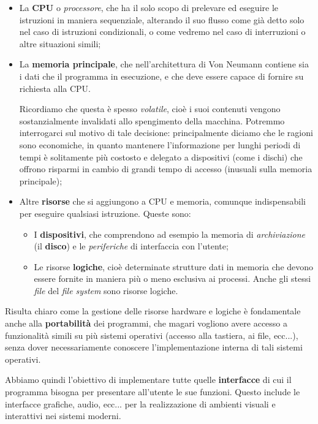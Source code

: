 \documentclass[a4paper,11pt]{article}
\begin{document}
\begin{itemize}
	\item La \textbf{CPU} o \textit{processore}, che ha il solo scopo di prelevare ed eseguire le istruzioni in maniera sequenziale, alterando il suo flusso come già detto solo nel caso di istruzioni condizionali, o come vedremo nel caso di interruzioni o altre situazioni simili;
	\item La \textbf{memoria principale}, che nell'architettura di Von Neumann contiene sia i dati che il programma in esecuzione, e che deve essere capace di fornire su richiesta alla CPU. 

		Ricordiamo che questa è spesso \textit{volatile}, cioè i suoi contenuti vengono sostanzialmente invalidati allo spengimento della macchina. Potremmo interrogarci sul motivo di tale decisione: principalmente diciamo che le ragioni sono economiche, in quanto mantenere l'informazione per lunghi periodi di tempi è solitamente più costosto e delegato a dispositivi (come i dischi) che offrono risparmi in cambio di grandi tempo di accesso (inusuali sulla memoria principale);
		
	\item Altre \textbf{risorse} che si aggiungono a CPU e memoria, comunque indispensabili per eseguire qualsiasi istruzione. Queste sono:
		\begin{itemize}
			\item I \textbf{dispositivi}, che comprendono ad esempio la memoria di \textit{archiviazione} (il \textbf{disco}) e le \textit{periferiche} di interfaccia con l'utente;
			\item Le risorse \textbf{logiche}, cioè determinate strutture dati in memoria che devono essere fornite in maniera più o meno esclusiva ai processi. Anche gli stessi \textit{file} del \textit{file system} sono risorse logiche.
		\end{itemize}
\end{itemize}

Risulta chiaro come la gestione delle risorse hardware e logiche è fondamentale anche alla \textbf{portabilità} dei programmi, che magari vogliono avere accesso a funzionalità simili su più sistemi operativi (accesso alla tastiera, ai file, ecc...), senza dover necessariamente conoscere l'implementazione interna di tali sistemi operativi.

Abbiamo quindi l'obiettivo di implementare tutte quelle \textbf{interfacce} di cui il programma bisogna per presentare all'utente le sue funzioni. Questo include le interfacce grafiche, audio, ecc... per la realizzazione di ambienti visuali e interattivi nei sistemi moderni.
\end{document}
